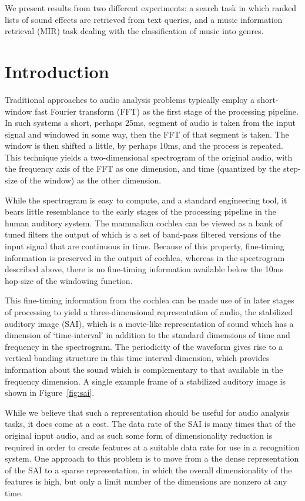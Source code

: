 We present results from two different experiments: a search task in which 
ranked lists of sound effects are retrieved from text queries, and a music 
information retrieval (MIR) task dealing with the classification of music into 
genres.

\section{Introduction}

Traditional approaches to audio analysis problems typically employ a 
short-window fast Fourier transform (FFT) as the first stage of the processing 
pipeline. In such systems a short, perhaps 25ms, segment of audio is taken 
from the input signal and windowed in some way, then the FFT of that segment 
is taken. The window is then shifted a little, by perhaps 10ms, and the 
process is repeated. This technique yields a two-dimensional spectrogram of 
the original audio, with the frequency axis of the FFT as one dimension, and 
time (quantized by the step-size of the window) as the other dimension.

While the spectrogram is easy to compute, and a standard engineering tool, it 
bears little resemblance to the early stages of the processing pipeline in the 
human auditory system. The mammalian cochlea can be viewed as a bank of tuned 
filters the output of which is a set of band-pass filtered versions of the 
input signal that are continuous in time. Because of this property, 
fine-timing information is preserved in the output of cochlea, whereas in the 
spectrogram described above, there is no fine-timing information available 
below the 10ms hop-size of the windowing function.

This fine-timing information from the cochlea can be made use of in later 
stages of processing to yield a three-dimensional representation of audio, the 
stabilized auditory image (SAI)\cite{patterson2000}, which is a movie-like representation of sound which has a dimension of 
`time-interval' in addition to the standard dimensions of time and frequency 
in the spectrogram. The periodicity of the waveform gives rise to a vertical 
banding structure in this time interval dimension, which provides information 
about the sound which is complementary to that available in the frequency 
dimension. A single example frame of a stabilized auditory image is shown in Figure~\ref{fig:sai}.

While we believe that such a representation should be useful for audio 
analysis tasks, it does come at a cost. The data rate of the SAI is many times 
that of the original input audio, and as such some form of dimensionality 
reduction is required in order to create features at a suitable data rate for 
use in a recognition system. One approach to this problem is to move from a 
the dense representation of the SAI to a sparse representation, in which the 
overall dimensionality of the features is high, but only a limit number of the 
dimensions are nonzero at any time.

